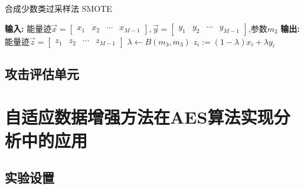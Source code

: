 {	\begin{algorithm}
		\caption{合成少数类过采样法 SMOTE}\label{alg:smote}
		\begin{algorithmic}[1]
			\Statex \textbf{输入:} 能量迹$\vec x=\begin{bmatrix}
			x_1&x_2&\cdots&x_{M-1}
			\end{bmatrix},\vec y=\begin{bmatrix}
			y_1&y_2&\cdots&y_{M-1}
			\end{bmatrix}$,参数$m_3$
			\Statex \textbf{输出:}能量迹$\vec z=\begin{bmatrix}
			z_1&z_2&\cdots&z_{M-1}
			\end{bmatrix}$
			\State $\lambda\gets B(m_3,m_3)$
			\State $z_i:=(1-\lambda)x_i+\lambda y_i$
			\EndFor
		\end{algorithmic}
	\end{algorithm}
	\subsection{攻击评估单元}
	\section{自适应数据增强方法在AES算法实现分析中的应用}
	\subsection{实验设置}
}
